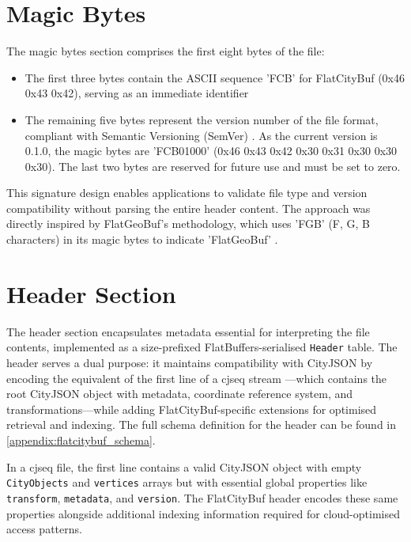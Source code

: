 \section{Magic Bytes}
\label{methodology:file_components:magic_bytes}

The magic bytes section comprises the first eight bytes of the file:
\begin{itemize}
  \item The first three bytes contain the ASCII sequence 'FCB' for FlatCityBuf (0x46 0x43 0x42), serving as an immediate identifier
  \item The remaining five bytes represent the version number of the file format, compliant with Semantic Versioning (SemVer) \citep{semver}. As the current version is 0.1.0, the magic bytes are 'FCB01000' (0x46 0x43 0x42 0x30 0x31 0x30 0x30 0x30). The last two bytes are reserved for future use and must be set to zero.
\end{itemize}

This signature design enables applications to validate file type and version compatibility without parsing the entire header content. The approach was directly inspired by FlatGeoBuf's methodology, which uses 'FGB' (F, G, B characters) in its magic bytes to indicate 'FlatGeoBuf' \citep{horance_2022_detail}.

\section{Header Section}
\label{methodology:file_components:header}

The header section encapsulates metadata essential for interpreting the file contents, implemented as a size-prefixed FlatBuffers-serialised \texttt{Header} table. The header serves a dual purpose: it maintains compatibility with CityJSON by encoding the equivalent of the first line of a \ac{cjseq} stream \citep{ledoux_2024}—which contains the root CityJSON object with metadata, coordinate reference system, and transformations—while adding FlatCityBuf-specific extensions for optimised retrieval and indexing. The full schema definition for the header can be found in \autoref{appendix:flatcitybuf_schema}.

In a \ac{cjseq} file, the first line contains a valid CityJSON object with empty \texttt{CityObjects} and \texttt{vertices} arrays but with essential global properties like \texttt{transform}, \texttt{metadata}, and \texttt{version}. The FlatCityBuf header encodes these same properties alongside additional indexing information required for cloud-optimised access patterns.

